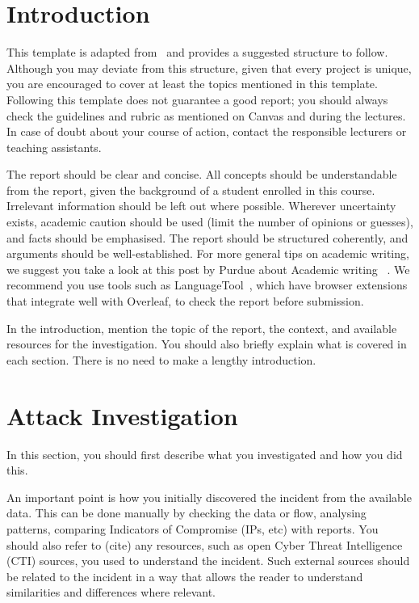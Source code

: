 \section{Introduction} \label{section: introduction}

This template is adapted from~\cite{report-template} and provides a suggested structure to follow. Although you may deviate from this structure, given that every project is unique, you are encouraged to cover at least the topics mentioned in this template. Following this template does not guarantee a good report; you should always check the guidelines and rubric as mentioned on Canvas and during the lectures. In case of doubt about your course of action, contact the responsible lecturers or teaching assistants.

The report should be clear and concise. All concepts should be understandable from the report, given the background of a student enrolled in this course. Irrelevant information should be left out where possible. Wherever uncertainty exists, academic caution should be used (limit the number of opinions or guesses), and facts should be emphasised. The report should be structured coherently, and arguments should be well-established. For more general tips on academic writing, we suggest you take a look at this post by Purdue about Academic writing ~\cite{academic-writing}. 
We recommend you use tools such as LanguageTool~\cite{language-tool}, which have browser extensions that integrate well with Overleaf, to check the report before submission.

In the introduction, mention the topic of the report, the context, and available resources for the investigation. You should also briefly explain what is covered in each section. There is no need to make a lengthy introduction.

\section{Attack Investigation} \label{section: attack investigation}
In this section, you should first describe what you investigated and how you did this. 

An important point is how you initially discovered the incident from the available data. This can be done manually by checking the data or flow, analysing patterns, comparing Indicators of Compromise (IPs, etc) with reports. You should also refer to (cite) any resources, such as open Cyber Threat Intelligence (CTI) sources, you used to understand the incident. Such external sources should be related to the incident in a way that allows the reader to understand similarities and differences where relevant.

